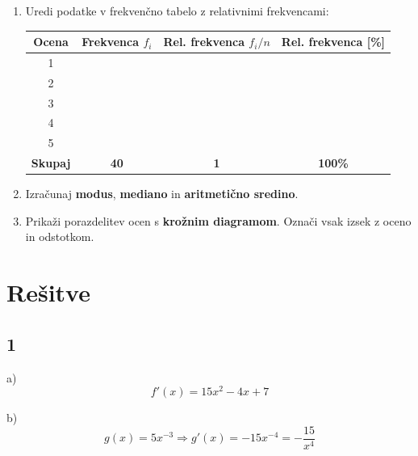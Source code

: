 \documentclass[a4paper,12pt]{article}
\begin{document}
\begin{enumerate}
  \item[a)] Uredi podatke v frekvenčno tabelo z relativnimi frekvencami:

  \vspace{0.3cm}
  \begin{center}
  \renewcommand{\arraystretch}{1.6}
  \begin{tabular}{|c|c|c|c|}
  \hline
  \textbf{Ocena} & \textbf{Frekvenca} $f_i$ & \textbf{Rel. frekvenca} $f_i / n$ & \textbf{Rel. frekvenca [\%]} \\
  \hline
  1 & & & \\
  \hline
  2 & & & \\
  \hline
  3 & & & \\
  \hline
  4 & & & \\
  \hline
  5 & & & \\
  \hline
  \textbf{Skupaj} & \textbf{40} & \textbf{1} & \textbf{100\%} \\
  \hline
  \end{tabular}
  \end{center}

  \vspace{0.5cm}

  \item[b)] Izračunaj \textbf{modus}, \textbf{mediano} in \textbf{aritmetično sredino}.

  \vspace{3cm}

  \item[c)] Prikaži porazdelitev ocen s \textbf{krožnim diagramom}. Označi vsak izsek z oceno in odstotkom.

  \vspace{5cm}

\end{enumerate}

\vfill

\newpage

\section*{Rešitve}

\subsection*{1}
a)
\[
f'(x)=15x^2-4x+7
\]

b)
\[
g(x)=5x^{-3} \Rightarrow g'(x)=-15x^{-4}=-\frac{15}{x^4}
\]
\end{document}
